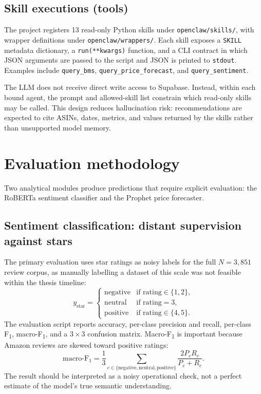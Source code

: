 \subsection{Skill executions (tools)}

The project registers 13 read-only Python skills under
\texttt{openclaw/skills/}, with wrapper definitions under
\texttt{openclaw/wrappers/}. Each skill exposes a \texttt{SKILL}
metadata dictionary, a \texttt{run(**kwargs)} function, and a CLI
contract in which JSON arguments are passed to the script and JSON is
printed to \texttt{stdout}. Examples include \texttt{query\_bms},
\texttt{query\_price\_forecast}, and \texttt{query\_sentiment}.

The LLM does not receive direct write access to Supabase. Instead, within
each bound agent, the prompt and allowed-skill list constrain which
read-only skills may be called. This design reduces hallucination risk:
recommendations are expected to cite ASINs, dates, metrics, and values
returned by the skills rather than unsupported model memory.

\section{Evaluation methodology}
\label{sec:eval}

Two analytical modules produce predictions that require explicit
evaluation: the RoBERTa sentiment classifier and the Prophet price
forecaster.

\subsection{Sentiment classification: distant supervision against stars}

The primary evaluation uses star ratings as noisy labels for the full $N = 3{,}851$ review corpus, as manually labelling a dataset of this scale was not feasible within the thesis timeline:
\begin{equation}
  \label{eq:star_proxy}
  y_{\text{star}} = \begin{cases}
    \text{negative} & \text{if rating} \in \{1, 2\}, \\
    \text{neutral}  & \text{if rating} = 3, \\
    \text{positive} & \text{if rating} \in \{4, 5\}.
  \end{cases}
\end{equation}
The evaluation script reports accuracy, per-class precision and recall,
per-class F\textsubscript{1}, macro-F\textsubscript{1}, and a
$3 \times 3$ confusion matrix. Macro-F\textsubscript{1} is important
because Amazon reviews are skewed toward positive ratings:
\begin{equation}
  \text{macro-F}_1 = \frac{1}{3}
  \sum_{c \in \{\text{negative}, \text{neutral}, \text{positive}\}}
    \frac{2 P_c R_c}{P_c + R_c}.
\end{equation}
The result should be interpreted as a noisy operational check, not a
perfect estimate of the model's true semantic understanding.

